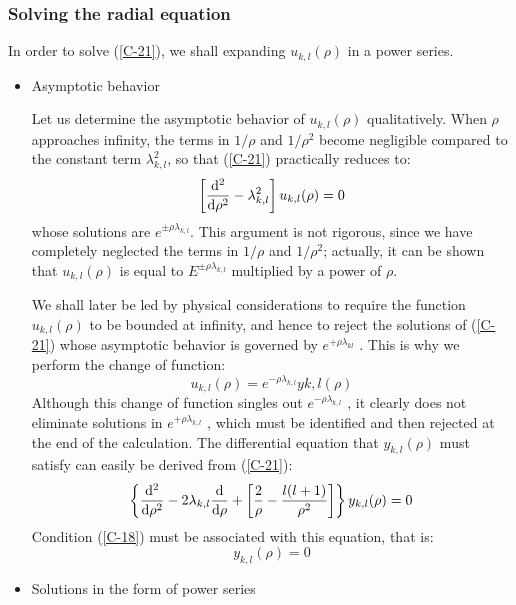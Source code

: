 \subsubsection{Solving the radial equation}
In order to solve (\ref{C-21}), we shall expanding $u_{k,l}(\rho)$ in a power series.

\begin{itemize}
	\item Asymptotic behavior

		Let us determine the asymptotic behavior of $u_{k,l}(\rho)$ qualitatively. When $\rho$ approaches infinity, the terms in $1/\rho$ and $1/\rho^2$ become negligible compared to the constant term $\lambda_{k,l}^2$, so that (\ref{C-21}) practically reduces to:
		\begin{equation}\label{C-22}
			\left[\dv[2]{\rho}-\lambda_{k,l}^2\right]u_{k,l}(\rho)=0
\end{equation}
whose solutions are $e^{\pm\rho\lambda_{k,l}}$. This argument is not rigorous, since we have completely neglected the terms in $1/\rho$ and $1/\rho^2$; actually, it can be shown that $u_{k,l}(\rho)$ is equal to $E^{\pm\rho\lambda_{k,l}}$ multiplied by a power of $\rho$.

We shall later be led by physical considerations to require the function $u_{k,l}(\rho)$ to be bounded at infinity, and hence to reject the solutions of (\ref{C-21}) whose asymptotic behavior is governed by $e^{+\rho\lambda_{kl}}$ . This is why we perform the change of function:
\begin{equation}\label{C-23}
	u_{k,l}(\rho)=e^{-\rho\lambda_{k,l}}y{k,l}(\rho)
\end{equation}
Although this change of function singles out $e^{-\rho\lambda_{k,l}}$ , it clearly does not eliminate solutions in $e^{+\rho\lambda_{k,l}}$ , which must be identified and then rejected at the end of the calculation. The differential equation that $y_{k,l}(\rho)$ must satisfy can easily be derived from (\ref{C-21}):
\begin{equation}\label{C-24}
	\left\{\dv[2]{\rho}-2\lambda_{k,l}\dv{\rho}+\left[\frac{2}{\rho}-\frac{l(l+1)}{\rho^2}\right]\right\}y_{k,l}(\rho)=0
\end{equation}
Condition (\ref{C-18}) must be associated with this equation, that is:
\begin{equation}\label{C-25}
	y_{k,l}(\rho)=0
\end{equation}
\item Solutions in the form of power series


\end{itemize}
